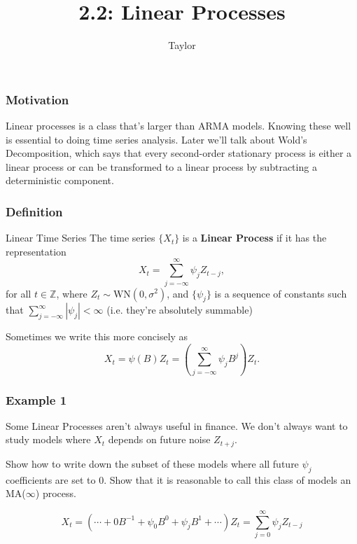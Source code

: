 \documentclass{beamer}
\title["2.2"]{2.2: Linear Processes}
\author{Taylor}
\institute[UVA] 
{
University of Virginia \\
\medskip
\textit{} 
}
\date{}
\begin{document}

\begin{frame}
\titlepage 
\end{frame}

\begin{frame}
\frametitle{Motivation}

Linear processes is a class that's larger than ARMA models. Knowing these well is essential to doing time series analysis. Later we'll talk about Wold's Decomposition, which says that every second-order stationary process is either a linear process or can be transformed to a linear process by subtracting a deterministic component.

\end{frame}


\begin{frame}
\frametitle{Definition}

\begin{block}{Linear Time Series}
The time series $\{X_t\}$ is a {\bf Linear Process} if it has the representation
\[
X_t = \sum_{j=-\infty}^{\infty} \psi_j Z_{t-j},
\]
for all $t \in \mathbb{Z}$, where $Z_t \sim \text{WN}(0,\sigma^2)$, and $\{\psi_j\}$ is a sequence of constants such that $\sum_{j=-\infty}^{\infty}|\psi_j| < \infty$ (i.e. they're absolutely summable)
\end{block}

Sometimes we write this more concisely as 
\[
X_t = \psi(B) Z_t = \left( \sum_{j=-\infty}^{\infty} \psi_j B^j \right) Z_t.
\]

\end{frame}



\begin{frame}
\frametitle{Example 1}

Some Linear Processes aren't always useful in finance. We don't always want to study models where $X_t$ depends on future noise $Z_{t+j}$. 
\newline
\pause

Show how to write down the subset of these models where all future $\psi_j$ coefficients are set to $0$. Show that it is reasonable to call this class of models an MA($\infty$) process.
\newline
\pause

\[
X_t = (\cdots+ 0 B^{-1} +  \psi_0 B^{0} + \psi_j B^1 + \cdots) Z_t = \sum_{j=0}^{\infty} \psi_j Z_{t-j}
\]

\end{frame}
\end{document}
